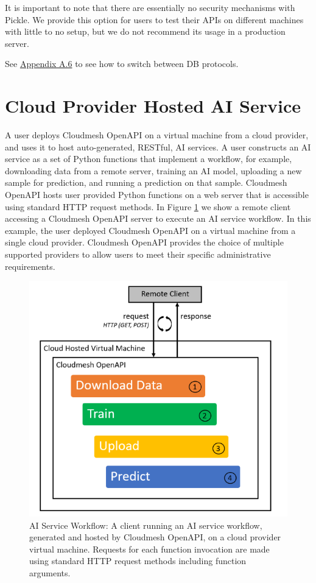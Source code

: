 It is important to note that there are essentially no security
mechanisms with Pickle. We provide this option for users to test their
APIs on different machines with little to no setup, but we do not
recommend its usage in a production server.

See
\protect\hyperlink{a6-switching-between-pickledb-and-mongodb}{Appendix
A.6} to see how to switch between DB protocols.

\section{Cloud Provider Hosted AI
Service}\label{cloud-provider-hosted-ai-service}

A user deploys Cloudmesh OpenAPI on a virtual machine from a cloud
provider, and uses it to host auto-generated, RESTful, AI services. A
user constructs an AI service as a set of Python functions that
implement a workflow, for example, downloading data from a remote
server, training an AI model, uploading a new sample for prediction, and
running a prediction on that sample. Cloudmesh OpenAPI hosts user
provided Python functions on a web server that is accessible using
standard HTTP request methods. In Figure \ref{fig:1} we show a remote client
accessing a Cloudmesh OpenAPI server to execute an AI service workflow.
In this example, the user deployed Cloudmesh OpenAPI on a virtual
machine from a single cloud provider. Cloudmesh OpenAPI provides the
choice of multiple supported providers to allow users to meet their
specific administrative requirements.

\begin{figure}[htb]
\centering
\includegraphics[width=\columnwidth]{../images/ai-service-workflow.png}
\caption{AI Service Workflow: A client running an AI service workflow, generated
and hosted by Cloudmesh OpenAPI, on a cloud provider virtual machine.
Requests for each function invocation are made using standard HTTP
request methods including function arguments.
}
\label{fig:1}
\end{figure}


